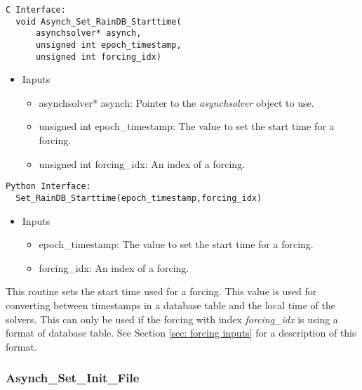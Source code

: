 \documentclass[12pt]{article}
\begin{document}
\begin{lstlisting}[style=CStyle]
  C Interface:
  void Asynch_Set_RainDB_Starttime(
      asynchsolver* asynch,
      unsigned int epoch_timestamp,
      unsigned int forcing_idx)
\end{lstlisting}
\begin{itemize}
 \item Inputs
  \begin{itemize}
   \item asynchsolver* asynch: Pointer to the \emph{asynchsolver} object to use.
   \item unsigned int epoch\_timestamp: The value to set the start time for a forcing.
   \item unsigned int forcing\_idx: An index of a forcing.
  \end{itemize}
\end{itemize}
\begin{lstlisting}[style=PythonStyle]
  Python Interface:
  Set_RainDB_Starttime(epoch_timestamp,forcing_idx)
\end{lstlisting}
\begin{itemize}
 \item Inputs
  \begin{itemize}
   \item epoch\_timestamp: The value to set the start time for a forcing.
   \item forcing\_idx: An index of a forcing.
  \end{itemize}
\end{itemize}
This routine sets the start time used for a forcing. This value is used for converting between timestamps in a database table and the local time of the solvers. This can only be used if the forcing with index \emph{forcing\_idx} is using a format of database table. See Section \ref{sec: forcing inputs} for a description of this format.



\subsubsection{Asynch\_Set\_Init\_File} \label{sec: asynch_set_init_file}
\end{document}
